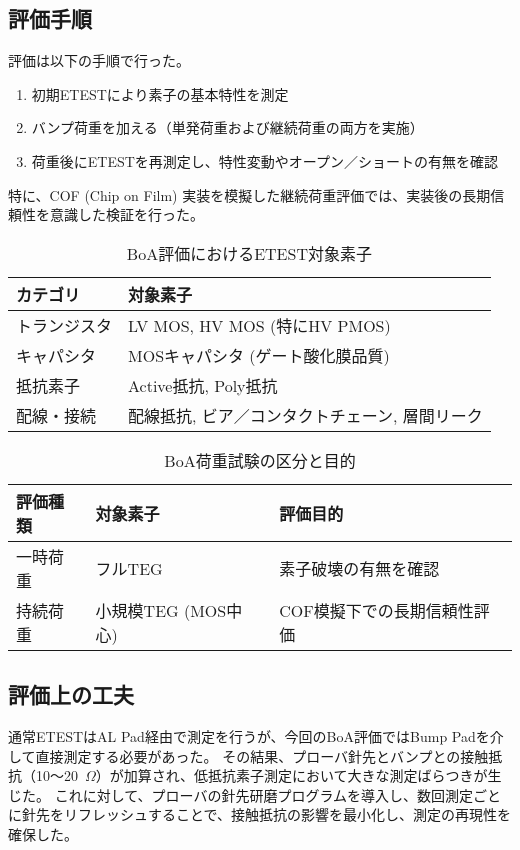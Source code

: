 \documentclass[conference]{IEEEtran}
\begin{document}
\subsection{評価手順}
評価は以下の手順で行った。
\begin{enumerate}
  \item 初期ETESTにより素子の基本特性を測定
  \item バンプ荷重を加える（単発荷重および継続荷重の両方を実施）
  \item 荷重後にETESTを再測定し、特性変動やオープン／ショートの有無を確認
\end{enumerate}
特に、COF (Chip on Film) 実装を模擬した継続荷重評価では、実装後の長期信頼性を意識した検証を行った。

\begin{table}[htbp]
\centering
\caption{BoA評価におけるETEST対象素子}
\label{tab:etest_devices}
\begin{tabular}{|l|l|}
\hline
カテゴリ & 対象素子 \\
\hline
トランジスタ & LV MOS, HV MOS (特にHV PMOS) \\
キャパシタ   & MOSキャパシタ (ゲート酸化膜品質) \\
抵抗素子     & Active抵抗, Poly抵抗 \\
配線・接続   & 配線抵抗, ビア／コンタクトチェーン, 層間リーク \\
\hline
\end{tabular}
\end{table}

\begin{table}[htbp]
\centering
\caption{BoA荷重試験の区分と目的}
\label{tab:load_test}
\begin{tabular}{|l|l|l|}
\hline
評価種類 & 対象素子 & 評価目的 \\
\hline
一時荷重 & フルTEG & 素子破壊の有無を確認 \\
持続荷重 & 小規模TEG (MOS中心) & COF模擬下での長期信頼性評価 \\
\hline
\end{tabular}
\end{table}

\subsection{評価上の工夫}
通常ETESTはAL Pad経由で測定を行うが、今回のBoA評価ではBump Padを介して直接測定する必要があった。  
その結果、プローバ針先とバンプとの接触抵抗（10〜20~$\Omega$）が加算され、低抵抗素子測定において大きな測定ばらつきが生じた。  
これに対して、プローバの針先研磨プログラムを導入し、数回測定ごとに針先をリフレッシュすることで、接触抵抗の影響を最小化し、測定の再現性を確保した。
\end{document}
